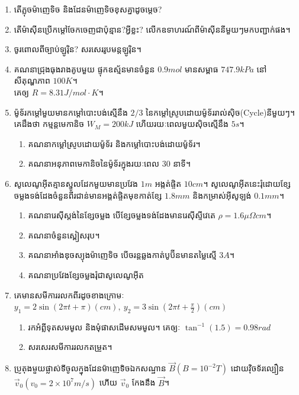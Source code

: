 \documentclass{officialexam}
\begin{document}
\begin{enumerate}[I]
	\item តើភ្លុចម៉ាញេទិច និងដែនម៉ាញេទិចខុសគ្នាដូចម្តេច?
	\item តើម៉ាសុីនប្រើកម្តៅចែកចេញជាប៉ុន្មាន?​អ្វីខ្លះ? លើកឧទាហរណ៍ពីម៉ាសុីននីមួយៗមកបញ្ជាក់ផង។
	\item ចូរពោលពីច្បាប់ឡូរុិន? សរសេររូបមន្តឡូរុិន។
	\item គណនាជ្រុងធុងរាងគូបមួយ ផ្ទុកឧស្ម័នមានចំនួន $0.9mol$ មានសម្ពាធ $747.9kPa$ នៅសីតុណ្ហភាព $100K$។ \\គេឲ្យ $R=8.31J/mol\cdot K$។
	\item ម៉ូទ័រកម្តៅមួយមានកម្តៅបោះបង់ស្មើនឹង $2/3$ នៃកម្តៅស្រូបដោយម៉ូទ័ររាល់សុិច({\en Cycle})នីមួយៗ។ គេដឹងថា កម្មន្តមេកានិច $W_{M}=200kJ$ ហើយរយៈពេលមួយសុិចស្មើនឹង $5s$។
	\begin{enumerate}[k]
		\item គណនាកម្តៅស្រូបដោយម៉ូទ័រ និងកម្តៅបោះបង់ដោយម៉ូទ័រ។
		\item គណនាអនុភាពមេកានិចនៃម៉ូទ័រក្នុងរយៈពេល $30$ នាទី។​​​​​​​​​​​​​​
	\end{enumerate}	
	\item សូលេណូអុីតគ្មានស្នូលដែកមួយមានប្រវែង $1m$ អង្កត់ផ្ចិត $10cm$។ សូលេណូអុីតនេះរុំដោយខ្សែចម្លងទង់ដែងចំនួនពីរជាន់មានអង្គត់ផ្ចិតមុខកាត់ខ្សែ $1.8mm$ និងកម្រាស់អុីសូឡង់ $0.1mm$។
	\begin{enumerate}[k]
		\item គណនារេសុីស្តង់នៃខ្សែចម្លង បើខ្សែចម្លងទង់ដែងមានរេសុីស្ទីវេតេ $\rho=1.6\mu\Omega cm$។
		\item គណនាចំនួនស្ពៀសរុប។
		\item គណនាអាំងឌុចស្យុងម៉ាញេទិច បើចរន្តឆ្លងកាត់បូប៊ីនមានតម្លៃស្មើ $3A$។
		\item គណនាប្រវែងខ្សែចម្លងរុំជាសូលេណូអុីត
	\end{enumerate}
	\item គេមានសមីការរលកពីរដូចខាងក្រោមៈ\\
	$y_{1}=2\sin\left(2\pi t+\pi\right)\left(cm\right),~y_{2}=3\sin\left(2\pi t+\frac{\pi}{2}\right)\left(cm\right)$
	\begin{enumerate}[k]
		\item រកអំព្លីទុតសមមូល និងមុំផាសដើមសមមូល។ គេឲ្យៈ $\tan^{-1}\left(1.5\right)=0.98rad$
		\item សរសេរសមីការរលកតម្រួត។
	\end{enumerate}
	\item ប្រូតុងមួយផ្លាស់ទីចូលក្នុងដែនម៉ាញេទិចឯកសណ្ឋាន $\overrightarrow{B}\left(B=10^{-2}T\right)$ ដោយវុិចទ័រល្បឿន $\overrightarrow{v}_{0}\left(v_{0}=2\times10^{7}m/s\right)$ ហើយ $\overrightarrow{v}_{0}$ កែងនឹង $\overrightarrow{B}$។

\end{enumerate}
\end{document}

